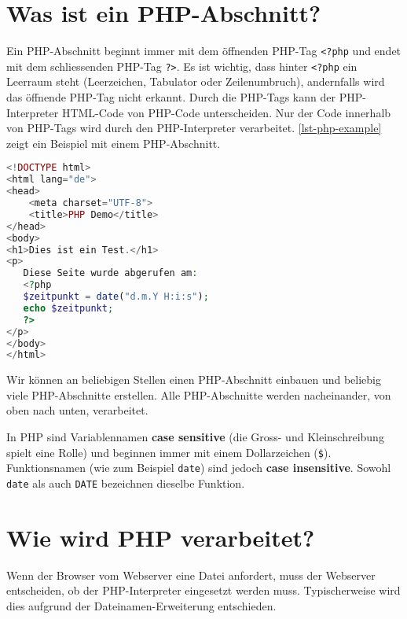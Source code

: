 \section{Was ist ein \acs{PHP}-Abschnitt?}

Ein \ac{PHP}-Abschnitt beginnt immer mit dem öffnenden \ac{PHP}-Tag \lstinline{<?php} und endet mit dem schliessenden \ac{PHP}-Tag \lstinline{?>}. Es ist wichtig, dass hinter \lstinline{<?php} ein Leerraum steht (Leerzeichen, Tabulator oder Zeilenumbruch), andernfalls wird das öffnende \ac{PHP}-Tag nicht erkannt. Durch die \ac{PHP}-Tags kann der \ac{PHP}-Interpreter \ac{HTML}-Code von \ac{PHP}-Code unterscheiden. Nur der Code innerhalb von \ac{PHP}-Tags wird durch den \ac{PHP}-Interpreter verarbeitet. \autoref{lst-php-example} zeigt ein Beispiel mit einem  \ac{PHP}-Abschnitt.


\begin{lstlisting}[language=PHP, alsolanguage=HTML, caption={Beispiel für eine \ac{PHP}-Datei.}, label={lst-php-example}]
<!DOCTYPE html>
<html lang="de">
<head>
    <meta charset="UTF-8">
    <title>PHP Demo</title>
</head>
<body>
<h1>Dies ist ein Test.</h1>
<p>
   Diese Seite wurde abgerufen am:
   <?php
   $zeitpunkt = date("d.m.Y H:i:s");
   echo $zeitpunkt;
   ?>
</p>
</body>
</html>
\end{lstlisting}

\begin{important}
	Wir können an beliebigen Stellen einen \ac{PHP}-Abschnitt einbauen und beliebig viele \ac{PHP}-Abschnitte erstellen. Alle \ac{PHP}-Abschnitte werden nacheinander, von oben nach unten, verarbeitet.
\end{important}

\begin{hinweis}
	In \ac{PHP} sind Variablennamen \textbf{case sensitive} (die Gross- und Kleinschreibung spielt eine Rolle) und beginnen immer mit einem Dollarzeichen (\texttt{\$}). Funktionsnamen (wie zum Beispiel \lstinline{date}) sind jedoch \textbf{case insensitive}. Sowohl \lstinline{date} als auch \lstinline{DATE} bezeichnen dieselbe Funktion. 
\end{hinweis}

\section{Wie wird \ac{PHP} verarbeitet?}

Wenn der Browser vom Webserver eine Datei anfordert, muss der Webserver entscheiden, ob der \ac{PHP}-Interpreter eingesetzt werden muss. Typischerweise wird dies aufgrund der Dateinamen-Erweiterung entschieden.

